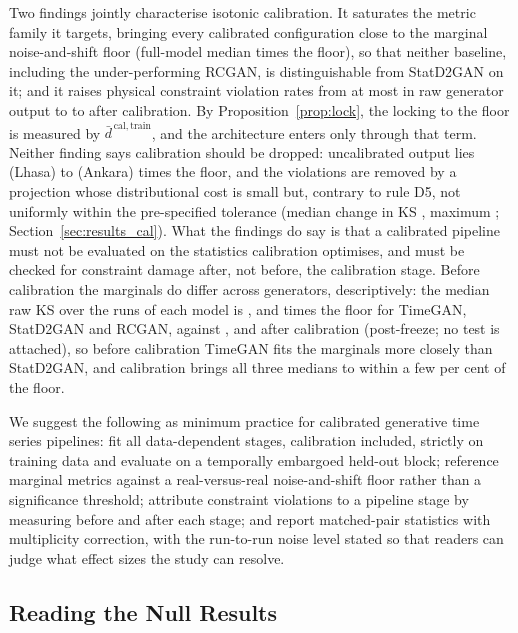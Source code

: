 \documentclass[preprint,12pt]{elsarticle}
\begin{document}
Two findings jointly characterise isotonic calibration.  It saturates
the metric family it targets, bringing every calibrated configuration
close to the marginal noise-and-shift floor (full-model median
\ksRatioFullMedian{} times the floor), so that neither baseline,
including the under-performing RCGAN, is distinguishable from StatD2GAN
on it; and it raises physical constraint violation rates from at most
\physRawBergen{} in raw generator output to \physCalAnkara{} to
\physCalYakutsk{} after calibration.
By Proposition~\ref{prop:lock}, the locking to the floor is measured by
$\bar d^{\,\mathrm{cal,train}}$, and the architecture enters only through that
term.
Neither finding says calibration should be dropped: uncalibrated output
lies \ksRatioNoCalLhasa{} (Lhasa) to \ksRatioNoCalAnkara{} (Ankara) times
the floor, and the violations are removed by a projection whose
distributional cost is small but, contrary to rule D5, not uniformly
within the pre-specified tolerance (median change in KS \dKsMedianAll,
maximum \dKsMaxLhasa; Section~\ref{sec:results_cal}).  What the findings do say is that a
calibrated pipeline must not be evaluated on the statistics calibration
optimises, and must be checked for constraint damage after, not before,
the calibration stage.
Before calibration the marginals do differ across generators,
descriptively: the median raw KS over the \phSeedsPerModel{} runs of each
model is \phKsRatioRawTimeganMed{}, \phKsRatioRawFullMed{} and
\phKsRatioRawRcganMed{} times the floor for TimeGAN, StatD2GAN and RCGAN,
against \phKsRatioCalTimeganMed{}, \phKsRatioCalFullMed{} and
\phKsRatioCalRcganMed{} after calibration (post-freeze; no test is
attached), so before calibration TimeGAN fits the marginals more closely
than StatD2GAN, and calibration brings all three medians to within a
few per cent of the floor.

We suggest the following as minimum practice for calibrated generative
time series pipelines: fit all data-dependent stages, calibration
included, strictly on training data and evaluate on a temporally
embargoed held-out block; reference marginal metrics against a
real-versus-real noise-and-shift floor rather than a significance threshold;
attribute constraint violations to a pipeline stage by measuring before
and after each stage; and report matched-pair statistics with
multiplicity correction, with the run-to-run noise level stated so that
readers can judge what effect sizes the study can resolve.

\subsection{Reading the Null Results}
\end{document}
